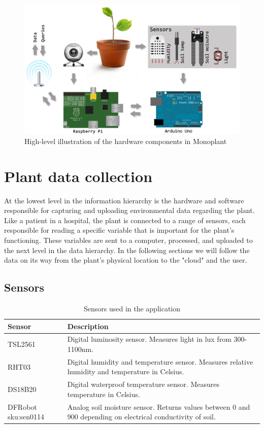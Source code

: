 \begin{figure}
\centering
\includegraphics[width=1\textwidth]{img/hardware/application.png}
\caption{High-level illustration of the hardware components in Monoplant}
\label{fig:application}
\end{figure}

\section{Plant data collection}
At the lowest level in the information hierarchy is the hardware and software responsible for capturing and uploading environmental data regarding the plant. Like a patient in a hospital, the plant is connected to a range of sensors, each responsible for reading a specific variable that is important for the plant's functioning. These variables are sent to a computer, processed, and uploaded to the next level in the data hierarchy. In the following sections we will follow the data on its way from the plant's physical location to the "cloud" and the user.

\subsection{Sensors}

\def\arraystretch{1.8}
\begin{table}
	\begin{tabular}{@{}lp{250pt}@{}}\toprule
	Sensor               & Description \\ \midrule                                                                                                  
	TSL2561              & Digital luminosity sensor. Measures light in lux from 300-1100nm.                                            \\ 
	RHT03                & Digital humidity and temperature sensor. Measures relative humidity and temperature in Celsius.              \\ 
	DS18B20              & Digital waterproof temperature sensor. Measures temperature in Celsius.                                       \\ 
	DFRobot sku:sen0114  & Analog soil moisture sensor. Returns values between 0 and 900 depending on electrical conductivity of soil.  \\ \bottomrule
	\end{tabular}
	\caption{Sensors used in the application}
\end{table}


